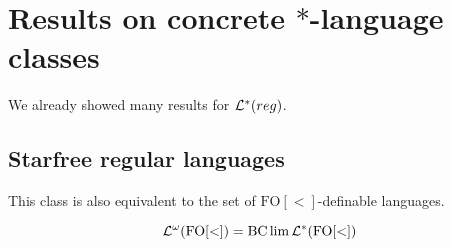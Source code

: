 \section{Results on concrete $*$-language classes}

We already showed many results for $\mathcal{L}^*(reg)$.

\subsection{Starfree regular languages}
This class is also equivalent to the set of $\mathrm{FO[<]}$-definable languages.

\begin{thm}
\[ \mathcal{L}^\omega (\mathrm{FO[<]}) = \operatorname{BC} \lim \mathcal{L}^*(\mathrm{FO[<]}) \]
\end{thm}

